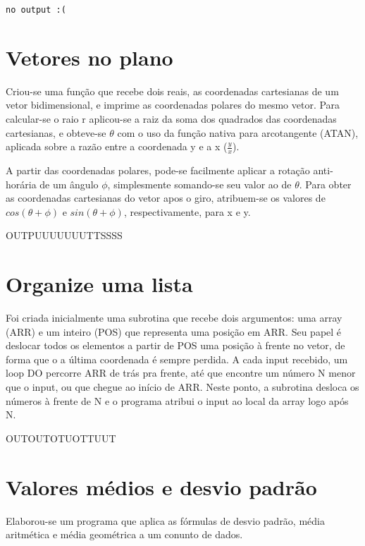 \documentclass{article}
\begin{document}
\begin{lstlisting}
no output :(
\end{lstlisting}

\section{Vetores no plano}

Criou-se uma função que recebe dois reais, as coordenadas cartesianas de um vetor bidimensional, e imprime as coordenadas polares do mesmo vetor. Para calcular-se o raio r aplicou-se a raiz da soma dos quadrados das coordenadas cartesianas, e obteve-se $\theta$ com o uso da função nativa para arcotangente (ATAN), aplicada sobre a razão entre a coordenada y e a x ($\frac{y}{x}$).\par
A partir das coordenadas polares, pode-se facilmente aplicar a rotação anti-horária de um ângulo $\phi$, simplesmente somando-se seu valor ao de $\theta$. Para obter as coordenadas cartesianas do vetor apos o giro, atribuem-se os valores de $cos(\theta + \phi)$ e $sin(\theta + \phi)$, respectivamente, para x e y.

OUTPUUUUUUUTTSSSS

\section{Organize uma lista}

Foi criada inicialmente uma subrotina que recebe dois argumentos: uma array (ARR) e um inteiro (POS) que representa uma posição em ARR. Seu papel é deslocar todos os elementos a partir de POS uma posição à frente no vetor, de forma que o a última coordenada é sempre perdida. A cada input recebido, um loop DO percorre ARR de trás pra frente, até que encontre um número N menor que o input, ou que chegue ao início de ARR. Neste ponto, a subrotina desloca os números à frente de N e o programa atribui o input ao local da array logo após N.

OUTOUTOTUOTTUUT

\section{Valores médios e desvio padrão}

Elaborou-se um programa que aplica as fórmulas de desvio padrão, média aritmética e média geométrica a um conunto de dados.
\end{document}
